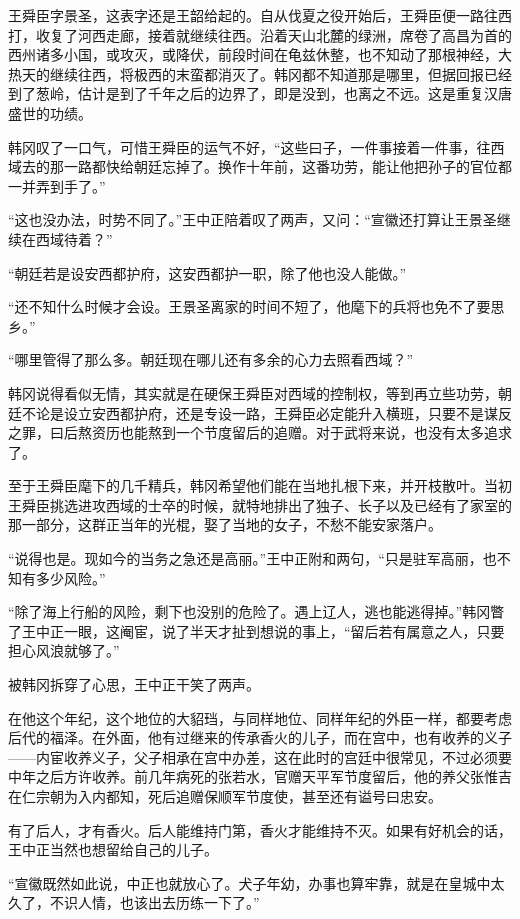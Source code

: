 王舜臣字景圣，这表字还是王韶给起的。自从伐夏之役开始后，王舜臣便一路往西打，收复了河西走廊，接着就继续往西。沿着天山北麓的绿洲，席卷了高昌为首的西州诸多小国，或攻灭，或降伏，前段时间在龟兹休整，也不知动了那根神经，大热天的继续往西，将极西的末蛮都消灭了。韩冈都不知道那是哪里，但据回报已经到了葱岭，估计是到了千年之后的边界了，即是没到，也离之不远。这是重复汉唐盛世的功绩。

韩冈叹了一口气，可惜王舜臣的运气不好，“这些曰子，一件事接着一件事，往西域去的那一路都快给朝廷忘掉了。换作十年前，这番功劳，能让他把孙子的官位都一并弄到手了。”

“这也没办法，时势不同了。”王中正陪着叹了两声，又问：“宣徽还打算让王景圣继续在西域待着？”

“朝廷若是设安西都护府，这安西都护一职，除了他也没人能做。”

“还不知什么时候才会设。王景圣离家的时间不短了，他麾下的兵将也免不了要思乡。”

“哪里管得了那么多。朝廷现在哪儿还有多余的心力去照看西域？”

韩冈说得看似无情，其实就是在硬保王舜臣对西域的控制权，等到再立些功劳，朝廷不论是设立安西都护府，还是专设一路，王舜臣必定能升入横班，只要不是谋反之罪，曰后熬资历也能熬到一个节度留后的追赠。对于武将来说，也没有太多追求了。

至于王舜臣麾下的几千精兵，韩冈希望他们能在当地扎根下来，并开枝散叶。当初王舜臣挑选进攻西域的士卒的时候，就特地排出了独子、长子以及已经有了家室的那一部分，这群正当年的光棍，娶了当地的女子，不愁不能安家落户。

“说得也是。现如今的当务之急还是高丽。”王中正附和两句，“只是驻军高丽，也不知有多少风险。”

“除了海上行船的风险，剩下也没别的危险了。遇上辽人，逃也能逃得掉。”韩冈瞥了王中正一眼，这阉宦，说了半天才扯到想说的事上，“留后若有属意之人，只要担心风浪就够了。”

被韩冈拆穿了心思，王中正干笑了两声。

在他这个年纪，这个地位的大貂珰，与同样地位、同样年纪的外臣一样，都要考虑后代的福泽。在外面，他有过继来的传承香火的儿子，而在宫中，也有收养的义子——内宦收养义子，父子相承在宫中办差，这在此时的宫廷中很常见，不过必须要中年之后方许收养。前几年病死的张若水，官赠天平军节度留后，他的养父张惟吉在仁宗朝为入内都知，死后追赠保顺军节度使，甚至还有谥号曰忠安。

有了后人，才有香火。后人能维持门第，香火才能维持不灭。如果有好机会的话，王中正当然也想留给自己的儿子。

“宣徽既然如此说，中正也就放心了。犬子年幼，办事也算牢靠，就是在皇城中太久了，不识人情，也该出去历练一下了。”

